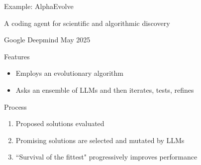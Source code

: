 \begin{frame}{Example: AlphaEvolve} 

    A coding agent for scientific and algorithmic discovery

    \begin{figure}
       \centering
    \end{figure}

    \begin{center}
        Google Deepmind May 2025
    \end{center}

\end{frame}

\begin{frame}
    
    Features

        \vspace{0.5em}

    \begin{itemize}
        \item Employs an evolutionary algorithm
        \vspace{0.5em}
        \item Asks an ensemble of LLMs and then iterates, tests, refines
        \vspace{0.5em}
    \end{itemize}

        \vspace{0.5em}
        \vspace{0.5em}
    Process

        \vspace{0.5em}

    \begin{enumerate}
        \item Proposed solutions evaluated 
        \vspace{0.5em}
        \item Promising solutions are selected and mutated by LLMs 
        \vspace{0.5em}
        \item ``Survival of the fittest" progressively improves performance
    \end{enumerate}

\end{frame}


